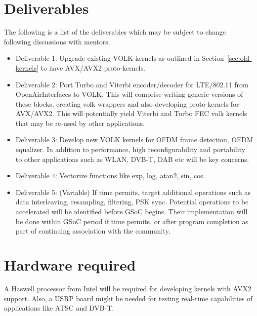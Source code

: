 \documentclass[a4paper,12pt,oneside]{article}
\begin{document}
\section{Deliverables}
The following is a list of the deliverables which may be subject to change following discussions with mentors. 
\begin{itemize}
\item Deliverable 1: Upgrade existing VOLK kernels as outlined in Section~\ref{sec:old-kernels} to have AVX/AVX2 proto-kernels.
\item Deliverable 2: Port Turbo and Viterbi encoder/decoder for LTE/802.11 from OpenAirInterfaces to VOLK. This will comprise writing generic versions of these blocks, creating volk wrappers and also developing proto-kernels for AVX/AVX2. This will potentially yield Viterbi and Turbo FEC volk kernels that may be re-used by other applications.  
\item Deliverable 3: Develop new VOLK kernels for OFDM frame detection, OFDM equalizer. In addition to performance, high reconfigurability and portability to other applications such as WLAN, DVB-T, DAB etc will be key concerns.  
\item Deliverable 4: Vectorize functions like exp, log, atan2, sin, cos.  
\item Deliverable 5: (Variable) If time permits, target additional operations such as data interleaving, resampling, filtering, PSK sync. Potential operations to be accelerated will be identified before GSoC begins. Their implementation will be done within GSoC period if time permits, or after program completion as part of continuing association with the community.
\end{itemize}

\section{Hardware required}

A Haswell processor from Intel will be required for developing kernels with AVX2 support. Also, a USRP board might be needed for testing real-time capabilities of applications like ATSC and DVB-T. 
\end{document}
